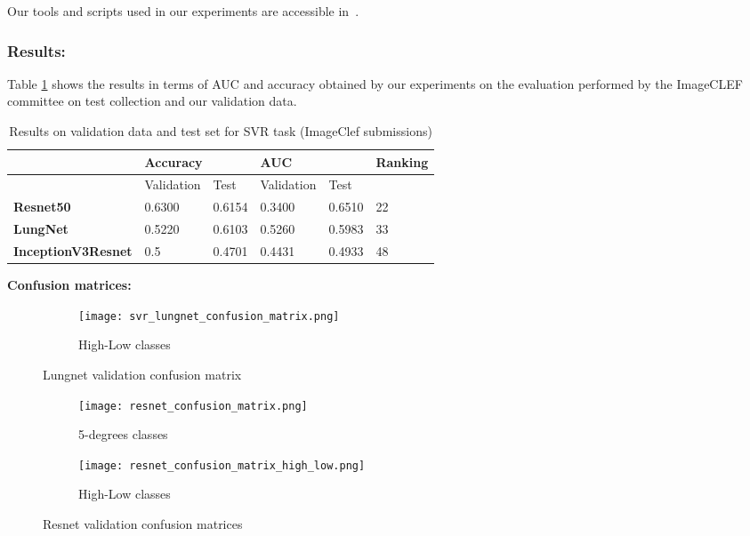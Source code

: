 Our tools and scripts used in our experiments are accessible in~\cite{anouargit}.

\subsubsection{Results:}

Table \ref{rsrs} shows the results in terms of AUC and accuracy obtained by our experiments on the evaluation performed by the ImageCLEF committee on test collection and our validation data.
\begin{table}
\center
\begin{tabular}{|l|l|l|l|l|l|l|}
\hline
          & \multicolumn{2}{l|}{Accuracy} & \multicolumn{2}{l|}{AUC} & \multicolumn{2}{l|}{Ranking}                                         \\ \hline
          & Validation      & Test        & Validation    & Test     & \multicolumn{2}{l|}{} \\ \hline
\textbf{Resnet50}  & 0.6300            & 0.6154      & 0.3400          & 0.6510   & \multicolumn{2}{l|}{22}                                              \\ \hline
\textbf{LungNet}   & 0.5220           & 0.6103      & 0.5260         & 0.5983   & \multicolumn{2}{l|}{33}                                              \\ \hline
\textbf{InceptionV3Resnet} & 0.5           & 0.4701      & 0.4431         & 0.4933   & \multicolumn{2}{l|}{ 48} \\ \hline

\end{tabular}
\caption{Results on validation data and test set for SVR task (ImageClef submissions)}
\label{rsrs}
\end{table}
\newpage
\textbf{Confusion matrices:}
\begin{figure}[h!]
\centering
  \begin{subfigure}[b]{0.4\linewidth}
    \texttt{[image: svr\_lungnet\_confusion\_matrix.png]}
    \caption{High-Low classes}
  \end{subfigure}
\label{lungnet_conf_mat}
\caption{Lungnet validation confusion matrix }
\end{figure}

\begin{figure}[h!]
\centering
  \begin{subfigure}[b]{0.4\linewidth}
    \texttt{[image: resnet\_confusion\_matrix.png]}
    \caption{5-degrees classes}
  \end{subfigure}
  \begin{subfigure}[b]{0.4\linewidth}
    \texttt{[image: resnet\_confusion\_matrix\_high\_low.png]}
    \caption{High-Low classes}
  \end{subfigure}
\label{resnet_conf_mat}
\caption{Resnet validation confusion matrices }
\end{figure}

